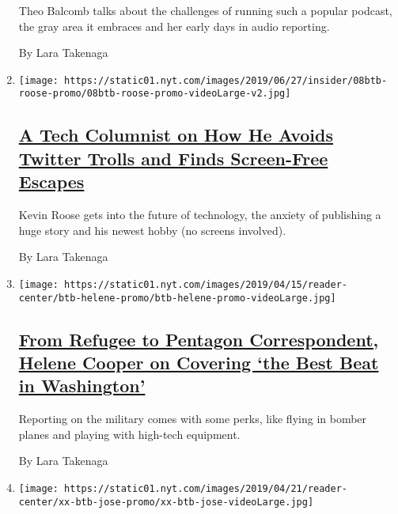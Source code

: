 \begin{enumerate}
  Theo Balcomb talks about the challenges of running such a popular
  podcast, the gray area it embraces and her early days in audio
  reporting.

  By Lara Takenaga
\item
  \texttt{[image: https://static01.nyt.com/images/2019/06/27/insider/08btb-roose-promo/08btb-roose-promo-videoLarge-v2.jpg]}

  \hypertarget{a-tech-columnist-on-how-he-avoids-twitter-trolls-and-finds-screen-free-escapes}{%
  \subsection{\texorpdfstring{\href{/2019/06/08/reader-center/kevin-roose-technology-the-shift.html}{A
  Tech Columnist on How He Avoids Twitter Trolls and Finds Screen-Free
  Escapes}}{A Tech Columnist on How He Avoids Twitter Trolls and Finds Screen-Free Escapes}}\label{a-tech-columnist-on-how-he-avoids-twitter-trolls-and-finds-screen-free-escapes}}

  Kevin Roose gets into the future of technology, the anxiety of
  publishing a huge story and his newest hobby (no screens involved).

  By Lara Takenaga
\item
  \texttt{[image: https://static01.nyt.com/images/2019/04/15/reader-center/btb-helene-promo/btb-helene-promo-videoLarge.jpg]}

  \hypertarget{from-refugee-to-pentagon-correspondent-helene-cooper-on-covering-the-best-beat-in-washington}{%
  \subsection{\texorpdfstring{\href{/2019/04/12/reader-center/helene-cooper-pentagon-correspondent.html}{From
  Refugee to Pentagon Correspondent, Helene Cooper on Covering `the Best
  Beat in
  Washington'}}{From Refugee to Pentagon Correspondent, Helene Cooper on Covering `the Best Beat in Washington'}}\label{from-refugee-to-pentagon-correspondent-helene-cooper-on-covering-the-best-beat-in-washington}}

  Reporting on the military comes with some perks, like flying in bomber
  planes and playing with high-tech equipment.

  By Lara Takenaga
\item
  \texttt{[image: https://static01.nyt.com/images/2019/04/21/reader-center/xx-btb-jose-promo/xx-btb-jose-videoLarge.jpg]}

  \hypertarget{jose-del-real-on-the-emotional-weight-and-thematic-whiplash-of-covering-california}{%
}
\end{enumerate}
